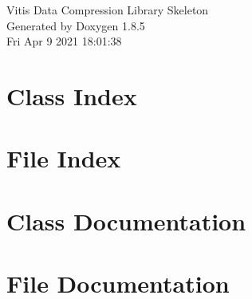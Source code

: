 \documentclass[twoside]{book}
\newcommand{\clearemptydoublepage}{%
  \newpage{\pagestyle{empty}\cleardoublepage}%
}
\begin{document}
\hypersetup{pageanchor=false}
\begin{titlepage}
\vspace*{7cm}
\begin{center}%
{\Large Vitis Data Compression Library Skeleton }\\
\vspace*{1cm}
{\large Generated by Doxygen 1.8.5}\\
\vspace*{0.5cm}
{\small Fri Apr 9 2021 18:01:38}\\
\end{center}
\end{titlepage}
\clearemptydoublepage
\tableofcontents
\clearemptydoublepage
{}
\hypersetup{pageanchor=true}

\chapter{Class Index}

\chapter{File Index}

\chapter{Class Documentation}









\chapter{File Documentation}




























\newpage
{}
{}
\printindex
\end{document}
